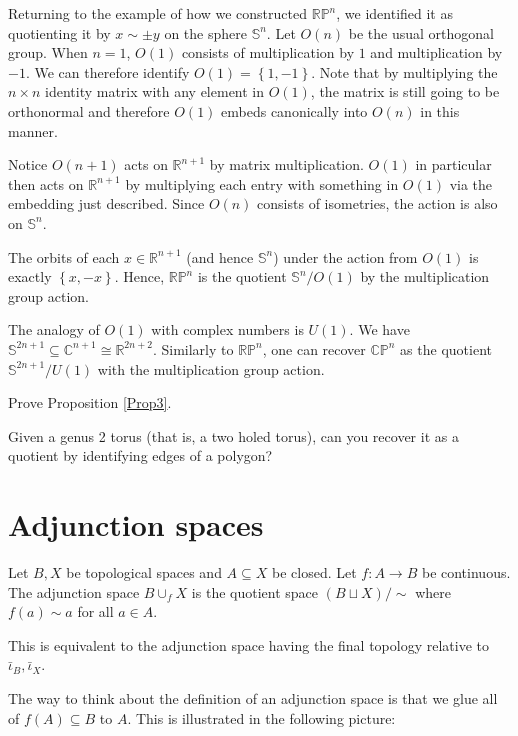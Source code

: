 \documentclass[12pt,reqno]{amsart}
\numberwithin{theorem}{section}
\theoremstyle{definition}
\theoremstyle{remark}
\numberwithin{equation}{section}
\newcommand{\C}{\mathbb C}
\renewcommand{\S}{\mathbb S}
\renewcommand{\P}{\mathbb{P}}
\newcommand{\set}[1]{\left \{ #1 \right \}}
\theoremstyle{definition}
\newcommand{\R}{\mathbb{R}}
\begin{document}
\begin{example}
    Returning to the example of how we constructed $\R \P^n$, we identified it as quotienting it by $x \sim \pm y$ on the sphere $\S^n$. Let $O(n)$ be the usual orthogonal group. When $n=1$, $O(1)$ consists of multiplication by $1$ and multiplication by $-1$. We can therefore identify $O(1) = \set{1,-1}$. Note that by multiplying the $n\times n$ identity matrix with any element in $O(1)$, the matrix is still going to be orthonormal and therefore $O(1)$ embeds canonically into $O(n)$ in this manner.
    
    Notice $O(n+1)$ acts on $\R^{n+1}$ by matrix multiplication. $O(1)$ in particular then acts on $\R^{n+1}$ by multiplying each entry with something in $O(1)$ via the embedding just described. Since $O(n)$ consists of isometries, the action is also on $\S^n$.
    
    The orbits of each $x \in \R^{n+1}$ (and hence $\S^n$) under the action from $O(1)$ is exactly $\set{x,-x}$. Hence, $\R\P^n$ is the quotient  $\S^n/O(1)$ by the multiplication group action. 

    The analogy of $O(1)$ with complex numbers is $U(1)$. We have $\S^{2n+1}\subseteq \C^{n+1} \cong \mathbb R^{2n+2}$. Similarly to $\R\P^n$, one can recover $\C \P^n$ as the quotient $\S^{2n+1}/U(1)$ with the multiplication group action.
\end{example}
\begin{exercise}
    Prove Proposition \ref{Prop3}.
\end{exercise}
\begin{exercise}
    Given a genus 2 torus (that is, a two holed torus), can you recover it as a quotient by identifying edges of a polygon?
\end{exercise}
\section{Adjunction spaces}

\begin{definition}
    Let $B,X$ be topological spaces and $A\subseteq X$ be closed. Let $f:A\rightarrow B$ be continuous. The adjunction space $B\cup_f X$ is the quotient space $(B\sqcup X)/\sim$ where $f(a) \sim a$ for all $a \in A$. 
\end{definition}
This is equivalent to the adjunction space having the final topology relative to $\bar \iota_B,\bar \iota_X$.

The way to think about the definition of an adjunction space is that we glue all of $f(A)\subseteq B$ to $A$. This is illustrated in the following picture:
\end{document}
